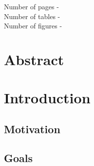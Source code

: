 \documentclass[11pt,a4paper]{article}
\begin{document}
\begin{titlepage}
    \title{}
    \author{
        , 
        , 
        \textsuperscript{*}
        \\ \\ \\
        \\
        
        \\ \\ \\
        \textsuperscript{*}
    }
\clearpage %
\maketitle
\vspace*{\fill}
\begin{flushright}{
        \noindent Number of pages - \pageref{LastPage} \\
        \noindent Number of tables - \totaltables \\
        \noindent Number of figures - \totalfigures 
}
\end{flushright}
\thispagestyle{empty} %
\end{titlepage}

\onehalfspacing %

\linenumbers %
\pagewiselinenumbers %
\modulolinenumbers[3] %

\section*{Abstract}

\newpage

\printnoidxglossary

\newpage

\section{Introduction} \label{sec-intro}

\subsection{Motivation} \label{sec-motiv}

\subsection{Goals} \label{sec-goals}
\end{document}
